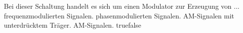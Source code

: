     {Bei dieser Schaltung handelt es sich um einen Modulator zur Erzeugung von ...}
    {frequenzmodulierten Signalen.}
    {phasenmodulierten Signalen.}
    {AM-Signalen mit unterdrücktem Träger.}
    {AM-Signalen.}
    {true}{false}